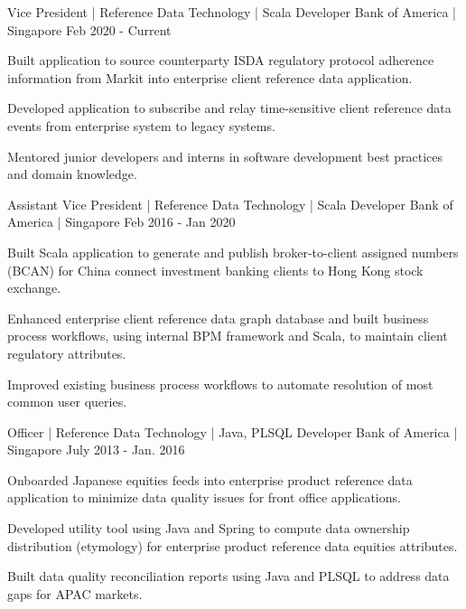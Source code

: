 \begin{cventries}
    {Vice President | Reference Data Technology | Scala Developer}
    {Bank of America | Singapore}
    {Feb 2020 - Current}
    {
      \begin{cvitems}
        \item {Built application to source counterparty ISDA regulatory protocol adherence information from Markit into enterprise client reference data application.}
        \item {Developed application to subscribe and relay time-sensitive client reference data events from enterprise system to legacy systems.}
        \item {Mentored junior developers and interns in software development best practices and domain knowledge.}
      \end{cvitems}
    }
    {Assistant Vice President | Reference Data Technology | Scala Developer }
    {Bank of America | Singapore}
    {Feb 2016 - Jan 2020}
    {
      \begin{cvitems}
        \item {Built Scala application to generate and publish broker-to-client assigned numbers (BCAN) for China connect investment banking clients to Hong Kong stock exchange.}
        \item {Enhanced enterprise client reference data graph database and built business process workflows, using internal BPM framework and Scala, to maintain client regulatory attributes.}
        \item {Improved existing business process workflows to automate resolution of most common user queries.}
      \end{cvitems}
    }
    {Officer | Reference Data Technology | Java, PLSQL Developer}
    {Bank of America | Singapore}
    {July 2013 - Jan. 2016}
    {
      \begin{cvitems}
        \item {Onboarded Japanese equities feeds into enterprise product reference data application to minimize data quality issues for front office applications.}
        \item {Developed utility tool using Java and Spring to compute data ownership distribution (etymology) for enterprise product reference data equities attributes.}
        \item {Built data quality reconciliation reports using Java and PLSQL to address data gaps for APAC markets.}
      \end{cvitems}
    }
\end{cventries}
